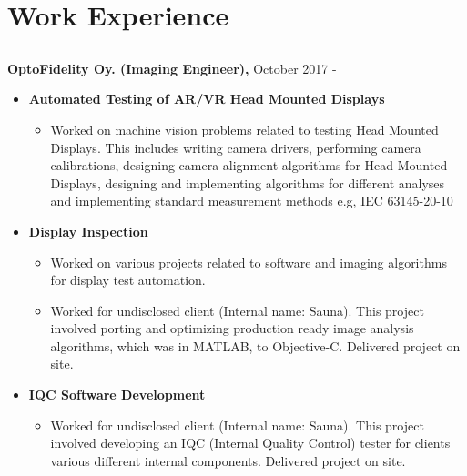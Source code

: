 \documentclass{article}
\begin{document}
\subsection{}

\section{Work Experience}
\subsection{}
\textbf{OptoFidelity Oy. (Imaging Engineer),} October 2017 -
\begin{itemize}[label={}]
  \item \textbf{Automated Testing of AR/VR Head Mounted Displays}
    \begin{itemize}[label={--}]
      \item Worked on machine vision problems related to testing Head Mounted
        Displays.  This includes writing camera drivers, performing camera
        calibrations, designing camera alignment algorithms for Head Mounted
        Displays, designing and implementing algorithms for different analyses and
        implementing standard measurement methods e.g, IEC 63145-20-10
    \end{itemize}

  \item \textbf{Display Inspection}
    \begin{itemize}[label={--}]
    \item Worked on various projects related to software and imaging algorithms
      for display test automation.
    \item Worked for undisclosed client (Internal name: Sauna). This project
      involved porting and optimizing production ready image analysis algorithms,
      which was in MATLAB, to Objective-C. Delivered project on site.
    \end{itemize}

  \item \textbf{IQC Software Development}
    \begin{itemize}[label={--}]
      \item Worked for undisclosed client (Internal name: Sauna). This project
        involved developing an IQC (Internal Quality Control) tester for clients
        various different internal components.  Delivered project on site.
    \end{itemize}

\end{itemize}
\end{document}
